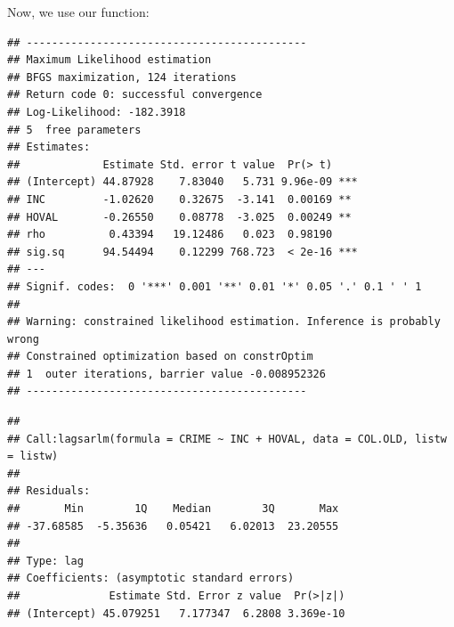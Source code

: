 Now, we use our function:

\begin{knitrout}
\color{fgcolor}\begin{kframe}
\begin{alltt}
 \hlstd{=}\hlstd{)}
 \hlkwb{<-} \hlopt{::}  \hlstd{=} \hlstd{)}

 \hlkwb{<-}  \hlopt{~}  \hlopt{+}     
\end{alltt}
\begin{verbatim}
## --------------------------------------------
## Maximum Likelihood estimation
## BFGS maximization, 124 iterations
## Return code 0: successful convergence 
## Log-Likelihood: -182.3918 
## 5  free parameters
## Estimates:
##             Estimate Std. error t value  Pr(> t)    
## (Intercept) 44.87928    7.83040   5.731 9.96e-09 ***
## INC         -1.02620    0.32675  -3.141  0.00169 ** 
## HOVAL       -0.26550    0.08778  -3.025  0.00249 ** 
## rho          0.43394   19.12486   0.023  0.98190    
## sig.sq      94.54494    0.12299 768.723  < 2e-16 ***
## ---
## Signif. codes:  0 '***' 0.001 '**' 0.01 '*' 0.05 '.' 0.1 ' ' 1
## 
## Warning: constrained likelihood estimation. Inference is probably wrong
## Constrained optimization based on constrOptim 
## 1  outer iterations, barrier value -0.008952326 
## --------------------------------------------
\end{verbatim}
\begin{alltt}
\hlstd{(}\hlstd{)}
 \hlkwb{<-}  \hlopt{~}  \hlopt{+}     
\end{alltt}
\begin{verbatim}
## 
## Call:lagsarlm(formula = CRIME ~ INC + HOVAL, data = COL.OLD, listw = listw)
## 
## Residuals:
##       Min        1Q    Median        3Q       Max 
## -37.68585  -5.35636   0.05421   6.02013  23.20555 
## 
## Type: lag 
## Coefficients: (asymptotic standard errors) 
##              Estimate Std. Error z value  Pr(>|z|)
## (Intercept) 45.079251   7.177347  6.2808 3.369e-10

\end{verbatim}
\end{kframe}
\end{knitrout}
